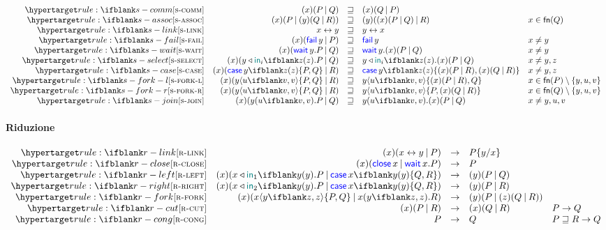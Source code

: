 \documentclass[a4paper]{article}
\begin{document}
\[
    \begin{array}{rrcll}
        \defrule{s-comm} &
        \Cut\x{P}{Q} & \pcong & \Cut\x{Q}{P} \\
        \defrule{s-assoc} &
        \Cut\x{P}{\Cut\y{Q}{R}} & \pcong & \Cut\y{\Cut\x{P}{Q}}{R} & x\in\fn{Q} \\
        \defrule{s-link} &
        \Link\x\y & \pcong & \Link\y\x \\
        \defrule{s-fail} &
        \Cut\x{\Fail\y}{P} & \pcong & \Fail\y & x \ne y \\
        \defrule{s-wait} &
        \Cut\x{\Wait\y.P}{Q} & \pcong & \Wait\y.\Cut\x{P}{Q} & x \ne y \\
        \defrule{s-select} &
        \Cut\x{\Select\y{\InTag_i}\z.P}{Q} & \pcong & \Select\y{\InTag_i}\z.\Cut\x{P}{Q} & x \ne y,z \\
        \defrule{s-case} &
        \Cut\x{\Case\y\z{P}{Q}}{R} & \pcong & \Case\y\z{\Cut\x{P}{R}}{\Cut\x{Q}{R}} & x \ne y,z \\
        \defrule{s-fork-l} &
        \Cut\x{\Fork\y\u\v{P}{Q}}{R} & \pcong & \Fork\y\u\v{\Cut\x{P}{R}}{Q} & x \in \fn{P}\setminus\set{y,u,v} \\
        \defrule{s-fork-r} &
        \Cut\x{\Fork\y\u\v{P}{Q}}{R} & \pcong & \Fork\y\u\v{P}{\Cut\x{Q}{R}} & x \in \fn{Q}\setminus\set{y,u,v} \\
        \defrule{s-join} &
        \Cut\x{\Join\y\u\v.P}{Q} & \pcong & \Join\y\u\v.\Cut\x{P}{Q} & x \ne y,u,v \\
    \end{array}
\]

\paragraph{Riduzione}

\[
    \begin{array}{rrcll}
        \defrule{r-link} &
        \Cut\x{\Link\x\y}{P} & \red & P\subst\y\x \\
        \defrule{r-close} &
        \Cut\x{\Close\x}{\Wait\x.P} & \red & P \\
        \defrule{r-left} &
        \Cut\x{\Left\x\y.P}{\Case\x\y{Q}{R}} & \red & \Cut\y{P}{Q} \\
        \defrule{r-right} &
        \Cut\x{\Right\x\y.P}{\Case\x\y{Q}{R}} & \red & \Cut\y{P}{R} \\
        \defrule{r-fork} &
        \Cut\x{\Fork\x\y\z{P}{Q}}{\Join\x\y\z.R} & \red & \Cut\y{P}{\Cut\z{Q}{R}} \\
        \defrule{r-cut} &
        \Cut\x{P}{R} & \red & \Cut\x{Q}{R} & P \red Q \\
        \defrule{r-cong} &
        P & \red & Q & P \pcong R \red Q \\
    \end{array}
\]
\end{document}
